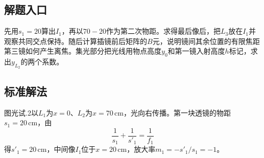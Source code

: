 \documentclass[UTF8,fontset=fandol,a4paper,11pt]{ctexart}
\begin{document}


\subsection*{解题入口}

先用$s_1=20$算出$I_1$，再以$70-20$作为第二次物距。求得最后像后，把$L_3$放在$I_1$并观察共同交点保持。随后计算插镜前后矩阵的$B$元，说明镜间其余位置的有限焦距第三镜如何产生离焦。集光部分把光线用物点高度$y_0$和第一镜入射高度$h$标记，求出$y_{L_2}$的两个系数。



\subsection*{标准解法}


图光试.2以$L_1$为$x=0$、$L_2$为$x=70\,\mathrm{cm}$，光向右传播。第一块透镜的物距$s_1=20\,\mathrm{cm}$，由
\[
\frac1{s_1}+\frac1{s'_1}=\frac1{f_1}
\]
得$s'_1=20\,\mathrm{cm}$，中间像$I_1$位于$x=20\,\mathrm{cm}$，放大率$m_1=-s'_1/s_1=-1$。
\end{document}
